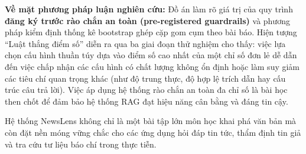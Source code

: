 \textbf{Về mặt phương pháp luận nghiên cứu:} Đồ án làm rõ giá trị của quy trình \textbf{đăng ký trước rào chắn an toàn (pre-registered guardrails)} và phương pháp kiểm định thống kê bootstrap ghép cặp gom cụm theo bài báo. Hiện tượng ``Luật thắng điểm số'' diễn ra qua ba giai đoạn thử nghiệm cho thấy: việc lựa chọn cấu hình thuần túy dựa vào điểm số cao nhất của một chỉ số đơn lẻ dễ dẫn đến việc chấp nhận các cấu hình có chất lượng không ổn định hoặc làm suy giảm các tiêu chí quan trọng khác (như độ trung thực, độ hợp lệ trích dẫn hay cấu trúc câu trả lời). Việc áp dụng hệ thống rào chắn an toàn đa chỉ số là bài học then chốt để đảm bảo hệ thống RAG đạt hiệu năng cân bằng và đáng tin cậy.

Hệ thống NewsLens không chỉ là một bài tập lớn môn học khai phá văn bản mà còn đặt nền móng vững chắc cho các ứng dụng hỏi đáp tin tức, thẩm định tin giả và tra cứu tư liệu báo chí trong thực tiễn.
